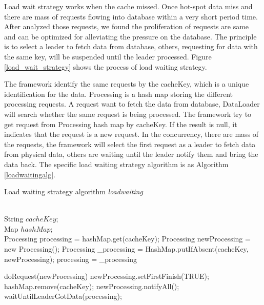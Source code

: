 \documentclass[conference]{IEEEtran}
\begin{document}
Load wait strategy works when the cache missed. Once hot-spot data miss and there are mass of requests flowing into database within a very short period time. After analyzed those requests, we found the proliferation of requests are same and can be optimized for alleviating the pressure on the database. The principle is to select a leader to fetch data from database, others, requesting for data with the same key, will be suspended until the leader processed. Figure \ref{load_wait_strategy} shows the process of load waiting strategy.

The framework identify the same requests by the cacheKey, which is a unique identification for the data. Processing is a hash map storing the different processing requests. A request want to fetch the data from database, DataLoader will search whether the same request is being processed. The framework try to get request from Processing hash map by cacheKey. If the result is null, it indicates that the request is a new request. In the concurrency, there are mass of the requests, the framework will select the first request as a leader to fetch data from physical data, others are waiting until the leader notify them and bring the data back. The speciﬁc load waiting strategy algorithm is as Algorithm \ref{loadwaitingalg}.

\begin{algorithm}
\caption{Load waiting strategy algorithm \textit{loadwaiting}}
\label{loadwaitingalg}

\scriptsize

\begin{algorithmic}[1]
\REQUIRE ~~\\
  String $cacheKey$;\\
  Map $hashMap$;
\ENSURE ~~\\

\STATE Processing processing = hashMap.get(cacheKey);
\STATE Processing newProcessing = new Processing();
\STATE Processing \_processing = HashMap.putIfAbsent(cacheKey, newProcessing);
\STATE processing = \_processing
\ENDIF
\ENDIF

\STATE doRequest(newProcessing)
\STATE newProcessing.setFirstFinish(TRUE);
\STATE hashMap.remove(cacheKey);
\STATE newProcessing.notifyAll();
\ELSE
\STATE waitUntilLeaderGotData(processing);
\ENDIF


\RETURN

\medskip

\end{algorithmic}
\end{algorithm}
\end{document}
